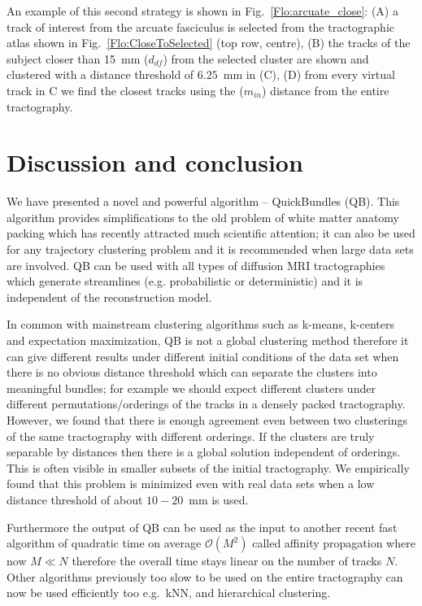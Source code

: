 \documentclass[preprint,authoryear,a4paper,10pt,onecolumn]{elsarticle}
\begin{document}
An example of this second strategy is shown in
Fig.~\ref{Flo:arcuate_close}: (A) a track of interest from the arcuate
fasciculus is selected from the tractographic atlas shown in
Fig.~\ref{Flo:CloseToSelected} (top row, centre), (B) the tracks of the
subject closer than 15~mm ($d_{df}$) from the selected cluster are shown
and clustered with a distance threshold of $6.25$~mm in (C), (D) from
every virtual track in C we find the closest tracks using the
($m_{in}$) distance from the entire tractography.


\section{Discussion and conclusion}

We have presented a novel and powerful algorithm --
QuickBundles (QB). This algorithm provides simplifications to the old
problem of white matter anatomy packing which has recently attracted
much scientific attention; it can also be used for any trajectory
clustering problem and it is recommended when large data sets are
involved. QB can be used with all types of diffusion MRI tractographies
which generate streamlines (e.g. probabilistic or deterministic) and it
is independent of the reconstruction model.

In common with mainstream clustering algorithms such as k-means,
k-centers and expectation maximization, QB is not a global clustering
method therefore it can give different results under different initial
conditions of the data set when there is no obvious distance threshold
which can separate the clusters into meaningful bundles; for example we
should expect different clusters under different permutations/orderings
of the tracks in a densely packed tractography. However, we found that
there is enough agreement even between two clusterings of the same
tractography with different orderings. If the clusters are truly
separable by distances then there is a global solution independent of
orderings. This is often visible in smaller subsets of the initial
tractography. We empirically found that this problem is minimized even
with real data sets when a low distance threshold of about $10-20$~mm is
used.

Furthermore the output of QB can be used as the input to another recent
fast algorithm of quadratic time on average $\mathcal{O}(M^{2})$ called affinity
propagation where now $M\ll N$ therefore the overall time stays linear
on the number of tracks $N$. Other algorithms previously too slow to be
used on the entire tractography can now be used efficiently too
e.g.~kNN, and hierarchical clustering.
\end{document}
